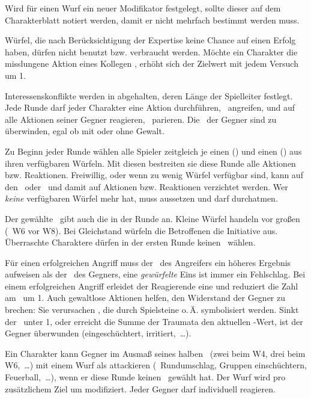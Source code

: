 {		Wird für einen Wurf ein neuer Modifikator festgelegt, sollte dieser auf dem Charakterblatt notiert werden, damit er nicht mehrfach bestimmt werden muss.

		Würfel, die nach Berücksichtigung der Expertise keine Chance auf einen Erfolg haben, dürfen nicht benutzt bzw. verbraucht werden. Möchte ein Charakter die misslungene Aktion eines Kollegen , erhöht sich der Zielwert mit jedem Versuch um 1.


		\noindent
		Interessenskonflikte werden in  abgehalten, deren Länge der Spielleiter festlegt. Jede Runde darf jeder Charakter eine Aktion durchführen, \zB\ angreifen, und auf alle Aktionen seiner Gegner reagieren, \zB\ parieren. Die \HD\ der Gegner sind zu überwinden, egal ob mit oder ohne Gewalt.

		Zu Beginn jeder Runde wählen alle Spieler zeitgleich je einen  (\AD) und einen  (\RD) aus ihren verfügbaren Würfeln. Mit diesen bestreiten sie diese Runde alle Aktionen bzw. Reaktionen. Freiwillig, oder wenn zu wenig Würfel verfügbar sind, kann auf den \AD\ oder \RD\ und damit auf Aktionen bzw. Reaktionen verzichtet werden. Wer \emph{keine} verfügbaren Würfel mehr hat, muss aussetzen und darf durchatmen.

		Der gewählte \AD\ gibt auch die  in der Runde an. Kleine Würfel handeln vor großen (\zB\ W6 vor W8). Bei Gleichstand würfeln die Betroffenen die Initiative aus. Überraschte Charaktere dürfen in der ersten Runde keinen \AD\ wählen.

		Für einen erfolgreichen Angriff muss der \AD\ des Angreifers ein höheres Ergebnis aufweisen als der \RD\ des Gegners, eine \emph{gewürfelte} Eins ist immer ein Fehlschlag. Bei einem erfolgreichen Angriff erleidet der Reagierende eine  und reduziert die Zahl am \HD\ um 1. Auch gewaltlose Aktionen helfen, den Widerstand der Gegner zu brechen: Sie verursachen , die durch Spielsteine o.\,Ä. symbolisiert werden. Sinkt der \HD\ unter 1, oder erreicht die Summe der Traumata den aktuellen \HD-Wert, ist der Gegner überwunden (eingeschüchtert, irritiert,~\ldots).

		Ein Charakter kann Gegner im Ausmaß seines halben \AD\ (zwei beim W4, drei beim W6,~\ldots) mit einem Wurf als  attackieren (\zB\ Rundumschlag, Gruppen einschüchtern, Feuerball,~\ldots), wenn er diese Runde keinen \RD\ gewählt hat. Der Wurf wird pro zusätzlichem Ziel um  modifiziert. Jeder Gegner darf individuell reagieren.

}
